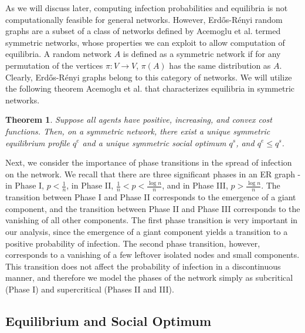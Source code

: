 \documentclass{article}
\theoremstyle{plain}
\newtheorem{theorem}{Theorem}
\begin{document}
As we will discuss later, computing infection probabilities and equilibria is not computationally feasible for general networks. However, Erd\H{o}s-R\'{e}nyi random graphs are a subset of a class of networks defined by Acemoglu et al. termed symmetric networks, whose properties we can exploit to allow computation of equilibria. A random network $A$ is defined as a symmetric network if for any permutation of the vertices $\pi : V \rightarrow V$, $\pi(A)$ has the same distribution as $A$. Clearly, Erd\H{o}s-R\'{e}nyi graphs belong to this category of networks. We will utilize the following theorem Acemoglu et al. that characterizes equilibria in symmetric networks.
\begin{theorem}
	Suppose all agents have positive, increasing, and convex cost functions. Then, on a symmetric network, there exist a unique symmetric equilibrium profile $q^e$ and a unique symmetric social optimum $q^s$, and $q^e \leq q^s$.
\end{theorem}
Next, we consider the importance of phase transitions in the spread of infection on the network. We recall that there are three significant phases in an ER graph - in Phase I, $p < \frac{1}{n}$, in Phase II, $\frac{1}{n} < p < \frac{\log{n}}{n}$, and in Phase III, $p >  \frac{\log{n}}{n}$. The transition between Phase I and Phase II corresponds to the emergence of a giant component, and the transition between Phase II and Phase III corresponds to the vanishing of all other components. The first phase transition is very important in our analysis, since the emergence of a giant component yields a transition to a positive probability of infection. The second phase transition, however, corresponds to a vanishing of a few leftover isolated nodes and small components. This transition does not affect the probability of infection in a discontinuous manner, and therefore we model the phases of the network simply as subcritical (Phase I) and supercritical (Phases II and III).

\subsection{Equilibrium and Social Optimum}
\end{document}
